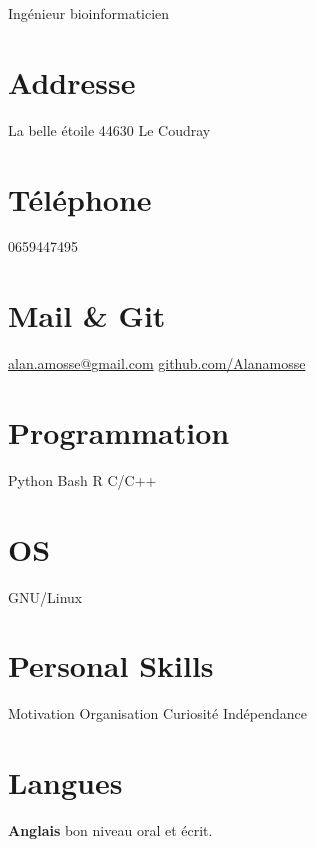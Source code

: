 \documentclass[]{friggeri-cv}
\begin{document}
      {Ingénieur bioinformaticien}
\begin{aside}
  \section{Addresse}
    La belle étoile
    44630 Le Coudray
    ~
  \section{Téléphone}
    0659447495
    ~
  \section{Mail \& Git}
    \href{mailto:alan.amosse@gmail.com}{alan.amosse@gmail.com}
    \href{https://github.com/Alanamosse}{github.com/Alanamosse}
    ~
  \section{Programmation}
    Python
    Bash
    R
    C/C++
    ~
  \section{OS}
    GNU/Linux
    ~
  \section{Personal Skills}
    Motivation
    Organisation
    Curiosité
    Indépendance
    ~
  \section{Langues}
    \textbf{Anglais} bon niveau oral et écrit.
\end{aside}
\end{document}
